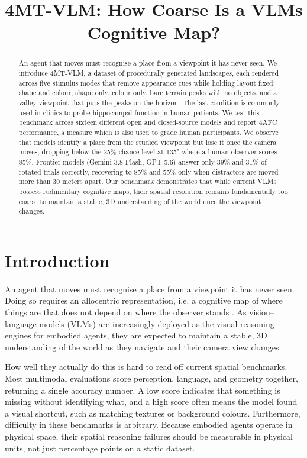 \documentclass{article}
\title{4MT-VLM: How Coarse Is a VLMs Cognitive Map?}
\author{}
\begin{document}
\maketitle

\begin{abstract}
An agent that moves must recognise a place from a viewpoint it has never seen. We introduce 4MT-VLM, a dataset of procedurally generated landscapes, each rendered across five stimulus modes that remove appearance cues while holding layout fixed: shape and colour, shape only, colour only, bare terrain peaks with no objects, and a valley viewpoint that puts the peaks on the horizon. The last condition is commonly used in clinics to probe hippocampal function in human patients. We test this benchmark across sixteen different open and closed-source models and report 4AFC performance, a measure which is also used to grade human participants. We observe that models identify a place from the studied viewpoint but lose it once the camera moves, dropping below the 25\% chance level at 135° where a human observer scores 85\%. Frontier models (Gemini 3.8 Flash, GPT-5.6) answer only 39\% and 31\% of rotated trials correctly, recovering to 85\% and 55\% only when distractors are moved more than 30 meters apart. Our benchmark demonstrates that while current VLMs possess rudimentary cognitive maps, their spatial resolution remains fundamentally too coarse to maintain a stable, 3D understanding of the world once the viewpoint changes.
\end{abstract}

\section{Introduction}

An agent that moves must recognise a place from a viewpoint it has never seen. Doing so requires an allocentric representation, i.e. a cognitive map of where things are that does not depend on where the observer stands \citep{tolman1948cognitive,okeefe1978hippocampus}. As vision--language models (VLMs) are increasingly deployed as the visual reasoning engines for embodied agents, they are expected to maintain a stable, 3D understanding of the world as they navigate and their camera view changes. 

How well they actually do this is hard to read off current spatial benchmarks. Most multimodal evaluations score perception, language, and geometry together, returning a single accuracy number. A low score indicates that something is missing without identifying what, and a high score often means the model found a visual shortcut, such as matching textures or background colours. Furthermore, difficulty in these benchmarks is arbitrary. Because embodied agents operate in physical space, their spatial reasoning failures should be measurable in physical units, not just percentage points on a static dataset.
\end{document}
